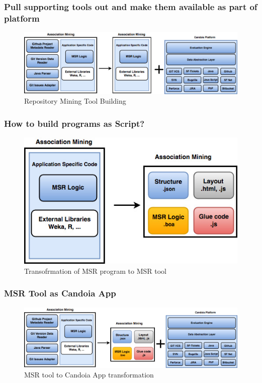         \begin{frame}
            \frametitle{Pull supporting tools out and make them available as part of platform}
            \begin{figure}
                \centering
                \includegraphics[width=0.75\linewidth]{figures/candoia_idea_overview.jpg}
                \caption{Repository Mining Tool Building}
            \end{figure}
        \end{frame}


        \begin{frame}
            \frametitle{How to build programs as Script?}
            \begin{figure}
                \centering
                \includegraphics[scale=0.25]{figures/programtoscript.jpg}
                \caption{Transofrmation of MSR program to MSR tool}
            \end{figure}
        \end{frame}

        \begin{frame}
            \frametitle{MSR Tool as Candoia App}
            \begin{figure}
                \centering
                \includegraphics[width=0.75\linewidth]{figures/programstoscriptincandoia.jpg}
                \caption{MSR tool to Candoia App transformation}
            \end{figure}
        \end{frame}

